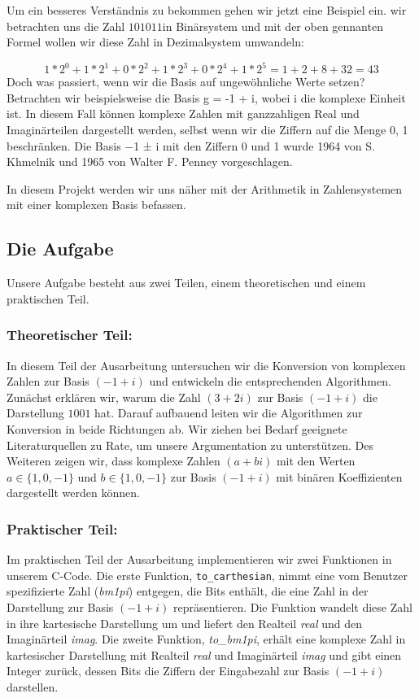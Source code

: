 \documentclass[course=erap]{aspdoc}
\begin{document}
Um ein besseres Verständnis zu bekommen gehen wir jetzt eine Beispiel ein. wir betrachten uns die Zahl $101011$\space in Binärsystem und mit der oben gennanten Formel wollen wir diese Zahl in Dezimalsystem umwandeln: 

\[1* 2^0 + 1*2^1 + 0* 2^2 + 1* 2^3 + 0* 2^4 + 1* 2^5 = 1+2+8+32 = 43 \]
Doch was passiert, wenn wir die Basis auf ungewöhnliche Werte setzen? Betrachten wir beispielsweise die Basis g = -1 + i, wobei i die komplexe Einheit ist. In diesem Fall können komplexe Zahlen mit ganzzahligen Real und Imaginärteilen dargestellt werden, selbst wenn wir die Ziffern auf die Menge {0, 1} beschränken. Die Basis −1 ± i mit den Ziffern 0 und 1 wurde 1964 von S. Khmelnik und 1965 von Walter F. Penney vorgeschlagen.

In diesem Projekt werden wir uns näher mit der Arithmetik in Zahlensystemen mit einer komplexen Basis befassen.

\subsection{Die Aufgabe}

Unsere Aufgabe besteht aus zwei Teilen, einem theoretischen und einem praktischen Teil.

\subsubsection{Theoretischer Teil:}
In diesem Teil der Ausarbeitung untersuchen wir die Konversion von komplexen Zahlen zur Basis $(-1 + i)$ und entwickeln die entsprechenden Algorithmen. Zunächst erklären wir, warum die Zahl $(3 + 2i)$ zur Basis $(-1 + i)$ die Darstellung $1001$ hat. Darauf aufbauend leiten wir die Algorithmen zur Konversion in beide Richtungen ab. Wir ziehen bei Bedarf geeignete Literaturquellen zu Rate, um unsere Argumentation zu unterstützen. Des Weiteren zeigen wir, dass komplexe Zahlen $(a + bi)$ mit den Werten $a \in \{1, 0, -1\}$ und $b \in \{1, 0, -1\}$ zur Basis $(-1 + i)$ mit binären Koeffizienten dargestellt werden können.

\subsubsection{Praktischer Teil:}
Im praktischen Teil der Ausarbeitung implementieren wir zwei Funktionen in unserem C-Code. Die erste Funktion, \texttt{to\_carthesian}, nimmt eine vom Benutzer spezifizierte Zahl (\textit{bm1pi}) entgegen, die Bits enthält, die eine Zahl in der Darstellung zur Basis $(-1 + i)$ repräsentieren. Die Funktion wandelt diese Zahl in ihre kartesische Darstellung um und liefert den Realteil \textit{real} und den Imaginärteil \textit{imag}. Die zweite Funktion, \textit{to\_bm1pi}, erhält eine komplexe Zahl in kartesischer Darstellung mit Realteil \textit{real} und Imaginärteil \textit{imag} und gibt einen Integer zurück, dessen Bits die Ziffern der Eingabezahl zur Basis $(-1 + i)$ darstellen.
\end{document}
